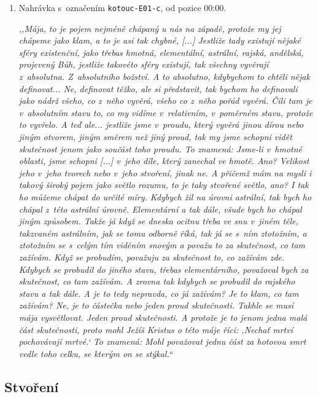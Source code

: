 \begin{enumerate}

\item{
Nahrávka s~označením \texttt{kotouc-E01-c}, od pozice 00:00.

\textit{%
,,Mája, to je pojem nejméně chápaný u nás na západě, protože my jej chápeme jako
klam, a to je asi tak chybné, [...] Jestliže tady existují nějaké sféry
existenční, jako třebas hmotná, elementální, astrální, rajská, andělská,
projevený Bůh, jestliže takovéto sféry existují, tak všechny vyvěrají z~absolutna.
Z~absolutního božství. A to absolutno, kdybychom to chtěli nějak definovat...
Ne, definovat těžko, ale si představit, tak bychom ho definovali jako nádrž
všeho, co z~něho vyvěrá, všeho co z~něho pořád vyvěrá. Čili tam je v~absolutním
stavu to, co my vidíme v~relativním, v~poměrném stavu, protože to vyvřelo. A
teď ale... jestliže jsme v~proudu, který vyvěrá jinou dírou nebo jiným otvorem,
jiným směrem než jiný proud, tak my jsme schopni vidět skutečnost jenom jako
součást toho proudu. To znamená: Jsme-li v~hmotné oblasti, jsme schopni [...] v~jeho
díle, který zanechal ve hmotě. Ano? Velikost jeho v~jeho tvorech nebo v~jeho
stvoření, jinak ne. A přičemž mám na mysli i takový široký pojem jako světlo
rozumu, to je taky stvořené světlo, ano? I tak ho můžeme chápat do určité míry.
Kdybych žil na úrovni astrální, tak bych ho chápal z~této astrální úrovně.
Elementární a tak dále, všude bych ho chápal jiným způsobem. Takže já když se
dneska ocitnu třeba ve snu v~jiném těle, takzvaném astrálním, jak se tomu odborně
říká, tak já se s~ním ztotožním, a ztotožním se s~celým tím viděním snovým a
považu to za skutečnost, co tam zažívám. Když se probudím, považuju za
skutečnost to, co zažívám zde. Kdybych se probudil do jiného stavu, třebas
elementárního, považoval bych za skutečnost, co tam zažívám. A zrovna tak
kdybych se probudil do
rajského stavu a tak dále. A je to tedy nepravda, co já zažívám? Je to
klam, co tam zažívám? Ne, je to částečka nebo jeden proud skutečnosti.
Takhle se musí mája vysvětlovat. Jeden proud skutečnosti. A
protože je to jenom jedna malá část skutečnosti, proto mohl Ježíš Kristus o této
máje říci: ,Nechať mrtví pochovávají mrtvé.` To znamená: Mohl považovat jednu
část za hotovou smrt vedle toho celku, se kterým on se stýkal.``
}

}

\end{enumerate}

\subsection{Stvoření}

